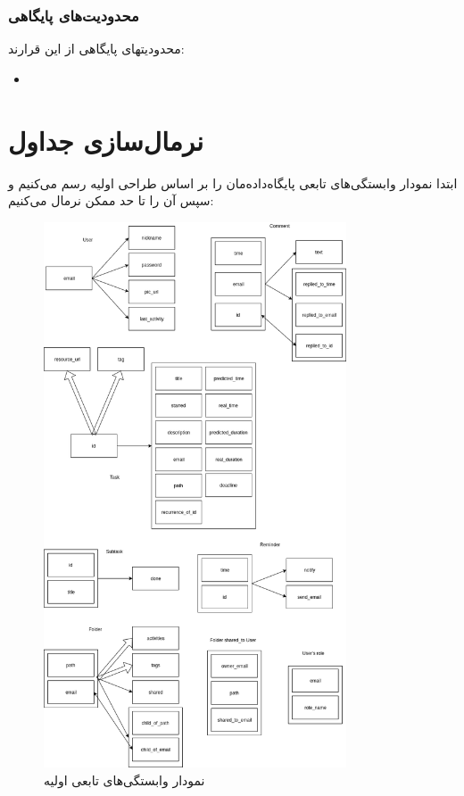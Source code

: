 \documentclass{article}
\begin{document}
\subsubsection*{محدودیت‌های پایگاهی}
محدودیتهای پایگاهی از این قرارند:
\begin{itemize}
\item

\end{itemize}

\section*{نرمال‌سازی جداول}

ابتدا نمودار وابستگی‌های تابعی پایگاه‌داده‌مان را بر اساس طراحی اولیه رسم می‌کنیم و سپس آن را تا حد ممکن نرمال می‌کنیم:

\newpage

\begin{figure}[ht]
  \centering  
  \includegraphics[width = 0.8\textwidth]{Fucntional_Dependancy.png}
  \caption{نمودار وابستگی‌های تابعی اولیه}
  \label{fig:fd1}
\end{figure}
\end{document}
